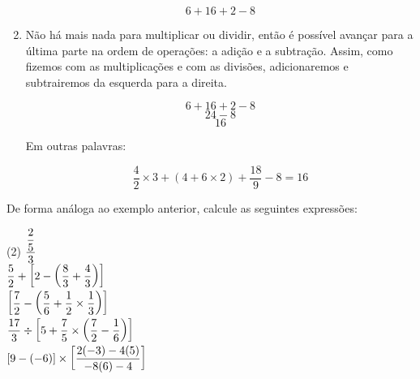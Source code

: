 \begin{enumerate}
            \begin{tcolorbox}[colback=white,colframe=minha_cor,coltitle=black,title=Passo 3.3] 
             \[
            6 + 16 + 2 - 8
            \]
            \end{tcolorbox}	
            		
		\item Não há mais nada para multiplicar ou dividir, então é possível avançar para a última 
		parte na ordem de operações: a adição e a subtração. Assim, como fizemos com as 
		multiplicações e com as divisões, adicionaremos e subtrairemos da esquerda para a 
		direita.
            \begin{tcolorbox}[colback=white,colframe=minha_cor,coltitle=black,title=Passo 4.1] 
             \[
            6 + 16 + 2 - 8
            \]
            \[
            24 - 8
            \]
            \[
            16
            \]
            \end{tcolorbox}	
		
		Em outras palavras:
            \begin{tcolorbox}[colback=white,colframe=minha_cor,coltitle=black,title=Passo 4.2] 
             \[
            \frac{4}{2} \times 3 + (4 + 6 \times 2) + \frac{18}{9} - 8 = 16
            \]
            \end{tcolorbox}				
	\end{enumerate}
	
	De forma análoga ao exemplo anterior, calcule as seguintes expressões:
	
	\begin{tasks}(2)
		\task $\displaystyle\frac{\displaystyle\frac{2}{5}}{3} $ \\[-0.25cm]
		\task $ \displaystyle\frac{5}{2} + \left[2 - \left(\displaystyle\frac{8}{3} + \displaystyle\frac{4}{3}\right) \right] $ \\[-0.25cm]
		\task $ \left[ \displaystyle\frac{7}{2} - \left(\displaystyle\frac{5}{6} + \displaystyle\frac{1}{2} \times \displaystyle\frac{1}{3}\right) \right] $ \\[-0.25cm]
		\task $ \displaystyle\frac{17}{3} \div \left[5 + \displaystyle\frac{7}{5} \times \left(\displaystyle\frac{7}{2} - \displaystyle\frac{1}{6}\right) \right] $ \\[-0.25cm]
		\task $ [9 - (-6)] \times \left[\displaystyle\frac{2(-3) - 4(5)}{-8(6) - 4}\right] $
	\end{tasks}
	
